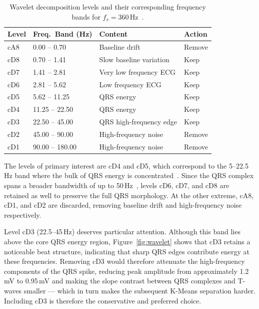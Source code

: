\documentclass[11pt]{article}
\begin{document}
\begin{table}[htbp]
    \centering
    \begin{tabular}{llll}
        \toprule
        \textbf{Level} & \textbf{Freq.\ Band (Hz)} & \textbf{Content} & \textbf{Action} \\
        \midrule
        cA8 & 0.00 -- 0.70   & Baseline drift          & Remove \\
        cD8 & 0.70 -- 1.41   & Slow baseline variation & Keep   \\
        cD7 & 1.41 -- 2.81   & Very low frequency ECG  & Keep   \\
        cD6 & 2.81 -- 5.62   & Low frequency ECG       & Keep   \\
        cD5 & 5.62 -- 11.25  & QRS energy              & Keep   \\
        cD4 & 11.25 -- 22.50 & QRS energy              & Keep   \\
        cD3 & 22.50 -- 45.00 & QRS high-frequency edge & Keep   \\
        cD2 & 45.00 -- 90.00 & High-frequency noise    & Remove \\
        cD1 & 90.00 -- 180.00 & High-frequency noise   & Remove \\
        \bottomrule
    \end{tabular}
    \caption{Wavelet decomposition levels and their corresponding frequency bands for $f_s = 360$\,Hz~\cite{sharma_qrs_2017, zidelmal_qrs_2012}.}
    \label{tab:wavelet-levels}
\end{table}

The levels of primary interest are cD4 and cD5, which correspond to the 5--22.5\,Hz band where the bulk of QRS energy is concentrated~\cite{sharma_qrs_2017, zidelmal_qrs_2012}. Since the QRS complex spans a broader bandwidth of up to 50\,Hz~\cite{tereshchenko_frequency_2015}, levels cD6, cD7, and cD8 are retained as well to preserve the full QRS morphology. At the other extreme, cA8, cD1, and cD2 are discarded, removing baseline drift and high-frequency noise respectively.

Level cD3 (22.5--45\,Hz) deserves particular attention. Although this band lies above the core QRS energy region, Figure~\ref{fig:wavelet} shows that cD3 retains a noticeable beat structure, indicating that sharp QRS edges contribute energy at these frequencies. Removing cD3 would therefore attenuate the high-frequency components of the QRS spike, reducing peak amplitude from approximately 1.2\,mV to 0.95\,mV and making the slope contrast between QRS complexes and T-waves smaller — which in turn makes the subsequent K-Means separation harder. Including cD3 is therefore the conservative and preferred choice.
\end{document}
